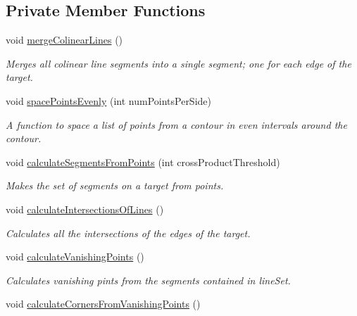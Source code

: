 \subsection*{Private Member Functions}
\begin{DoxyCompactItemize}
\item 
void \hyperlink{classTarget_a5863d9c3708b47db4e2a2bd60723c9d4}{mergeColinearLines} ()
\begin{DoxyCompactList}\small\item\em Merges all colinear line segments into a single segment; one for each edge of the target. \item\end{DoxyCompactList}\item 
void \hyperlink{classTarget_a11d364c4df4e83d475c33b4a4915a792}{spacePointsEvenly} (int numPointsPerSide)
\begin{DoxyCompactList}\small\item\em A function to space a list of points from a contour in even intervals around the contour. \item\end{DoxyCompactList}\item 
void \hyperlink{classTarget_a097b47c75568969a979ef67247b6f919}{calculateSegmentsFromPoints} (int crossProductThreshold)
\begin{DoxyCompactList}\small\item\em Makes the set of segments on a target from points. \item\end{DoxyCompactList}\item 
void \hyperlink{classTarget_a8dad4ab3c5aefb6a07aa41a4b450fdea}{calculateIntersectionsOfLines} ()
\begin{DoxyCompactList}\small\item\em Calculates all the intersections of the edges of the target. \item\end{DoxyCompactList}\item 
void \hyperlink{classTarget_a02a9ec40b224fe31bf6635bfc78820b3}{calculateVanishingPoints} ()
\begin{DoxyCompactList}\small\item\em Calculates vanishing pints from the segments contained in lineSet. \item\end{DoxyCompactList}\item 
void \hyperlink{classTarget_a8e4a735a5ce6ebaa32ac83712ec4e75f}{calculateCornersFromVanishingPoints} ()

\end{DoxyCompactItemize}
